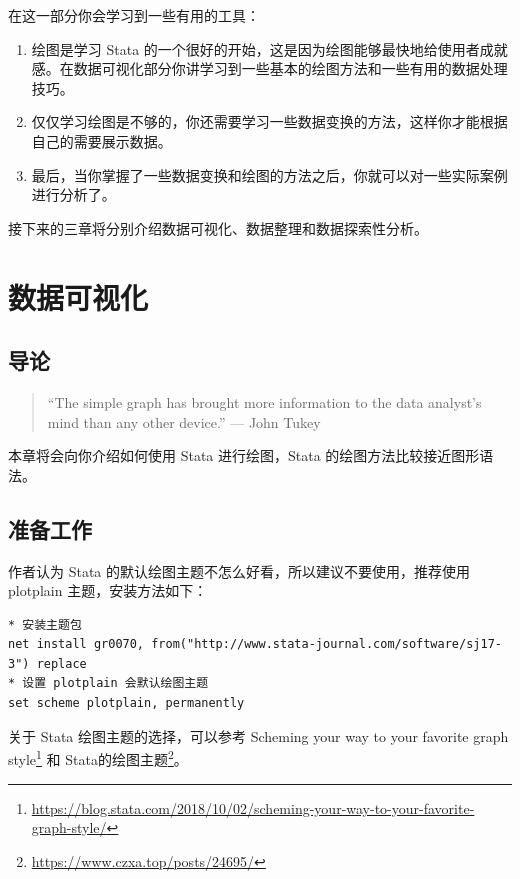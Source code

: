 \documentclass[]{ctexbook}
\providecommand{\tightlist}{%
  \setlength{\itemsep}{0pt}\setlength{\parskip}{0pt}}
\renewcommand{\href}[2]{#2\footnote{\url{#1}}}
\begin{document}
在这一部分你会学习到一些有用的工具：

\begin{enumerate}
\def\labelenumi{\arabic{enumi}.}
\tightlist
\item
  绘图是学习 Stata 的一个很好的开始，这是因为绘图能够最快地给使用者成就感。在数据可视化部分你讲学习到一些基本的绘图方法和一些有用的数据处理技巧。
\item
  仅仅学习绘图是不够的，你还需要学习一些数据变换的方法，这样你才能根据自己的需要展示数据。
\item
  最后，当你掌握了一些数据变换和绘图的方法之后，你就可以对一些实际案例进行分析了。
\end{enumerate}

接下来的三章将分别介绍数据可视化、数据整理和数据探索性分析。

\hypertarget{section-25}{%
\chapter{数据可视化}\label{section-25}}

\hypertarget{section-26}{%
\section{导论}\label{section-26}}

\begin{quote}
``The simple graph has brought more information to the data analyst's mind than any other device.'' --- John Tukey
\end{quote}

本章将会向你介绍如何使用 Stata 进行绘图，Stata 的绘图方法比较接近图形语法。

\hypertarget{section-27}{%
\section{准备工作}\label{section-27}}

作者认为 Stata 的默认绘图主题不怎么好看，所以建议不要使用，推荐使用 plotplain 主题，安装方法如下：

\begin{lstlisting}
* 安装主题包
net install gr0070, from("http://www.stata-journal.com/software/sj17-3") replace
* 设置 plotplain 会默认绘图主题
set scheme plotplain, permanently
\end{lstlisting}

关于 Stata 绘图主题的选择，可以参考 \href{https://blog.stata.com/2018/10/02/scheming-your-way-to-your-favorite-graph-style/}{Scheming your way to your favorite graph style} 和 \href{https://www.czxa.top/posts/24695/}{Stata的绘图主题}。
\end{document}
